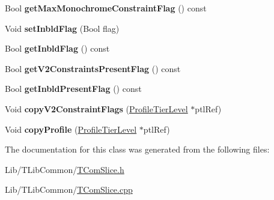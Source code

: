 \begin{DoxyCompactItemize}
\item 
\mbox{\label{class_profile_tier_level_a7201e31fb815c284bf53c5365ca86efb}} 
Bool {\bfseries get\+Max\+Monochrome\+Constraint\+Flag} () const
\item 
\mbox{\label{class_profile_tier_level_af11071b72e5a19769a64572710f77ca7}} 
Void {\bfseries set\+Inbld\+Flag} (Bool flag)
\item 
\mbox{\label{class_profile_tier_level_a16ff2068610f71858ffa2840ca74fe89}} 
Bool {\bfseries get\+Inbld\+Flag} () const
\end{DoxyCompactItemize}
{\bf }\par
\begin{DoxyCompactItemize}
\item 
\mbox{\label{class_profile_tier_level_aea663629537c7666bb0ef8a167c832c7}} 
Bool {\bfseries get\+V2\+Constraints\+Present\+Flag} () const
\item 
\mbox{\label{class_profile_tier_level_a1f6b271eb359a5c8a2772bfd626e565f}} 
Bool {\bfseries get\+Inbld\+Present\+Flag} () const
\item 
\mbox{\label{class_profile_tier_level_a0dd797d45cb8d8809e5125d6870f9938}} 
Void {\bfseries copy\+V2\+Constraint\+Flags} (\hyperlink{class_profile_tier_level}{Profile\+Tier\+Level} $\ast$ptl\+Ref)
\item 
\mbox{\label{class_profile_tier_level_aab07ce7f16edc0ee0f0d97ec41933243}} 
Void {\bfseries copy\+Profile} (\hyperlink{class_profile_tier_level}{Profile\+Tier\+Level} $\ast$ptl\+Ref)
\end{DoxyCompactItemize}



The documentation for this class was generated from the following files\+:\begin{DoxyCompactItemize}
\item 
Lib/\+T\+Lib\+Common/\hyperlink{_t_com_slice_8h}{T\+Com\+Slice.\+h}\item 
Lib/\+T\+Lib\+Common/\hyperlink{_t_com_slice_8cpp}{T\+Com\+Slice.\+cpp}\end{DoxyCompactItemize}
